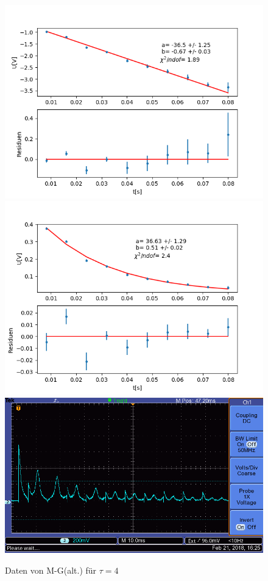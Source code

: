 \documentclass[12pt,a4paper]{article}
\begin{document}
\begin{figure}
\centering
\includegraphics[scale=0.5]{Bilder/T2Anhang/T2log4alt.png}
\includegraphics[scale=0.5]{Bilder/T2Anhang/T2exp4alt.png}
\includegraphics[scale=0.5]{Bilder/T2Anhang/T2plot4alt.png}
\caption{Daten von M-G(alt.) für $\tau = 4$}
\end{figure}
\end{document}
